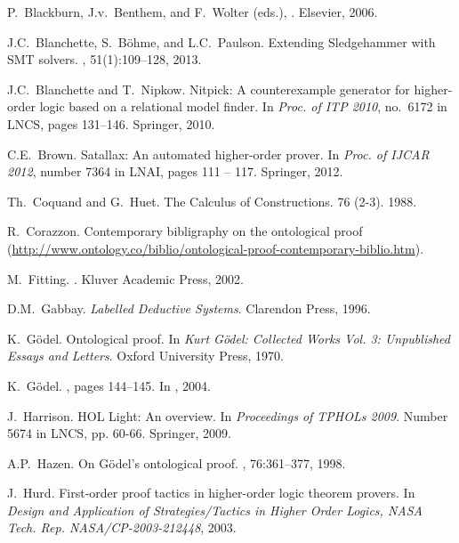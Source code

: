 \documentclass{llncs}
\begin{document}
\begin{thebibliography}{10}
P.~Blackburn, J.v.~Benthem, and F.~Wolter (eds.), . Elsevier, 2006.

J.C.~Blanchette, S.~B\"ohme, and L.C.~Paulson.
\newblock Extending {Sledgehammer} with {SMT} solvers.
, 51(1):109--128, 2013.

J.C.~Blanchette and T.~Nipkow.
\newblock Nitpick: A counterexample generator for higher-order logic based on a
  relational model finder.
\newblock In {\em Proc. of ITP 2010}, no.~6172 in LNCS, pages 131--146.
  Springer, 2010.

C.E.~Brown.
\newblock Satallax: An automated higher-order prover.
\newblock In {\em Proc. of IJCAR 2012}, number 7364 in LNAI, pages 111 -- 117.
  Springer, 2012.

Th.~Coquand and G.~Huet. 
\newblock The Calculus of Constructions. 
 76 (2-3). 1988.

R.~Corazzon.
\newblock Contemporary bibligraphy on the ontological proof
  (\url{http://www.ontology.co/biblio/ontological-proof-contemporary-biblio.htm}).

M.~Fitting.
.
\newblock Kluver Academic Press, 2002.

D.M.~Gabbay. {\em Labelled Deductive Systems}. Clarendon Press, 1996.

K.~G\"odel.
\newblock Ontological proof.
\newblock In {\em {Kurt G\"odel: Collected Works Vol. 3: Unpublished Essays and
  Letters}}. Oxford University Press, 1970.

K.~G\"odel.
, pages 144--145.
\newblock In  \cite{sobel2004logic}, 2004.


J.~Harrison.
\newblock HOL Light: An overview.
\newblock In {\em Proceedings of TPHOLs 2009}. Number 5674 in LNCS, pp. 60-66. Springer, 2009.

A.P.~Hazen.
\newblock On G\"odel's ontological proof.
, 76:361--377, 1998.


J.~Hurd.
\newblock First-order proof tactics in higher-order logic theorem provers.
\newblock In {\em Design and Application of Strategies/Tactics in Higher Order
  Logics, NASA Tech. Rep. NASA/CP-2003-212448}, 2003.


\end{thebibliography}
\end{document}
